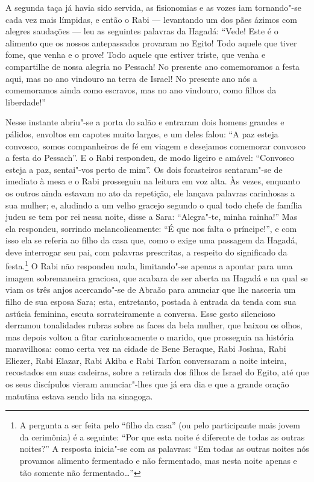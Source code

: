 A segunda taça já havia sido servida, as fisionomias e as vozes iam
tornando"-se cada vez mais límpidas, e então o Rabi --- levantando um
dos pães ázimos com alegres saudações --- leu as seguintes palavras da
Hagadá: ``Vede! Este é o alimento que os nossos antepassados provaram no
Egito! Todo aquele que tiver fome, que venha e o prove! Todo aquele que
estiver triste, que venha e compartilhe de nossa alegria no Pessach! No
presente ano comemoramos a festa aqui, mas no ano vindouro na terra de
Israel! No presente ano nós a comemoramos ainda como escravos, mas no
ano vindouro, como filhos da liberdade!''

Nesse instante abriu"-se a porta do salão e entraram dois homens
grandes e pálidos, envoltos em capotes muito largos, e um deles falou:
``A paz esteja convosco, somos companheiros de fé em viagem e desejamos
comemorar convosco a festa do Pessach''. E o Rabi respondeu, de modo
ligeiro e amável: ``Convosco esteja a paz, sentai"-vos perto de mim''.
Os dois forasteiros sentaram"-se de imediato à mesa e o Rabi
prosseguiu na leitura em voz alta. Às vezes, enquanto os outros ainda
estavam no ato da repetição, ele lançava palavras carinhosas a sua
mulher; e, aludindo a um velho gracejo segundo o qual todo chefe de
família judeu se tem por rei nessa noite, disse a Sara: ``Alegra"-te,
minha rainha!'' Mas ela respondeu, sorrindo melancolicamente: ``É que nos
falta o príncipe!'', e com isso ela se referia ao filho da casa que,
como o exige uma passagem da Hagadá, deve interrogar seu pai, com
palavras prescritas, a respeito do significado da
festa.\footnote{ A
pergunta a ser feita pelo ``filho da casa'' (ou pelo participante mais
jovem da cerimônia) é a seguinte: ``Por que esta noite é diferente de
todas as outras noites?'' A resposta inicia"-se com as palavras: ``Em
todas as outras noites nós provamos alimento fermentado e não
fermentado, mas nesta noite apenas e tão somente não fermentado\ldots''}
 O Rabi não respondeu nada, limitando"-se apenas a apontar para uma
imagem sobremaneira graciosa, que acabara de ser aberta na Hagadá e na
qual se viam os três anjos acercando"-se de Abraão para anunciar que
lhe nasceria um filho de sua esposa Sara; esta, entretanto, postada à
entrada da tenda com sua astúcia feminina, escuta sorrateiramente a
conversa. Esse gesto silencioso derramou tonalidades rubras sobre as
faces da bela mulher, que baixou os olhos, mas depois voltou a fitar
carinhosamente o marido, que prosseguia na história 
maravilhosa: como certa vez na cidade de Bene Beraque, Rabi Joshua,
Rabi Eliezer, Rabi Elazar, Rabi Akiba e Rabi Tarfon conversaram a noite
inteira, recostados em suas cadeiras, sobre a retirada dos filhos de
Israel do Egito, até que os seus discípulos vieram anunciar"-lhes que
já era dia e que a grande oração matutina estava sendo lida na
sinagoga.

